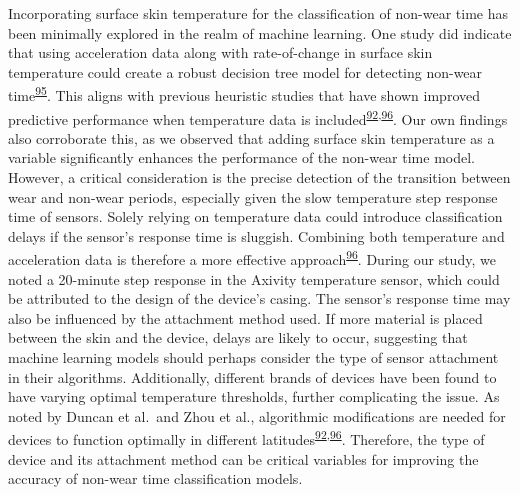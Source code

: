 \documentclass[
  9pt,
]{scrbook}
\begin{document}
Incorporating surface skin temperature for the classification of
non-wear time has been minimally explored in the realm of machine
learning. One study did indicate that using acceleration data along with
rate-of-change in surface skin temperature could create a robust
decision tree model for detecting non-wear
time\textsuperscript{\protect\hyperlink{ref-vert_detecting_2022}{95}}.
This aligns with previous heuristic studies that have shown improved
predictive performance when temperature data is
included\textsuperscript{\protect\hyperlink{ref-duncan_wear-time_2018}{92},\protect\hyperlink{ref-zhou_classification_2015}{96}}.
Our own findings also corroborate this, as we observed that adding
surface skin temperature as a variable significantly enhances the
performance of the non-wear time model. However, a critical
consideration is the precise detection of the transition between wear
and non-wear periods, especially given the slow temperature step
response time of sensors. Solely relying on temperature data could
introduce classification delays if the sensor's response time is
sluggish. Combining both temperature and acceleration data is therefore
a more effective
approach\textsuperscript{\protect\hyperlink{ref-zhou_classification_2015}{96}}.
During our study, we noted a 20-minute step response in the Axivity
temperature sensor, which could be attributed to the design of the
device's casing. The sensor's response time may also be influenced by
the attachment method used. If more material is placed between the skin
and the device, delays are likely to occur, suggesting that machine
learning models should perhaps consider the type of sensor attachment in
their algorithms. Additionally, different brands of devices have been
found to have varying optimal temperature thresholds, further
complicating the issue. As noted by Duncan et al.~and Zhou et al.,
algorithmic modifications are needed for devices to function optimally
in different
latitudes\textsuperscript{\protect\hyperlink{ref-duncan_wear-time_2018}{92},\protect\hyperlink{ref-zhou_classification_2015}{96}}.
Therefore, the type of device and its attachment method can be critical
variables for improving the accuracy of non-wear time classification
models.
\end{document}
